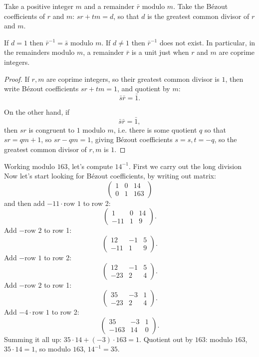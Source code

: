 \begin{theorem}
Take a positive integer \(m\) and a remainder \(\bar{r}\) modulo \(m\).
Take the B\'ezout coefficients of \(r\) and \(m\): \(sr+tm=d\), so that \(d\) is the greatest common divisor of \(r\) and \(m\).

If \(d=1\) then \(\bar{r}^{-1}=\bar{s}\) modulo \(m\).
If \(d \ne 1\) then \(\bar{r}^{-1}\) does not exist.
In particular, in the remainders modulo \(m\), a remainder \(\bar{r}\) is a unit just when \(r\) and \(m\) are coprime integers.
\end{theorem}
\begin{proof}
If \(r,m\) are coprime integers, so their greatest common divisor is \(1\), then write B\'ezout coefficients \(sr+tm=1\), and quotient by \(m\):
\[
\bar{s}\bar{r}=\bar{1}.
\]

On the other hand, if 
\[
\bar{s}\bar{r}=\bar{1},
\]
then \(sr\) is congruent to \(1\) modulo \(m\), i.e. there is some quotient \(q\) so that \(sr=qm+1\), so \(sr-qm=1\), giving B\'ezout coefficients \(s=s,t=-q\), so the greatest common divisor of \(r,m\) is \(1\).
\end{proof}
\begin{example}
Working modulo \(163\), let's compute \(14^{-1}\).
First we carry out the long division
Now let's start looking for B\'ezout coefficients, by writing out matrix:
\[
\begin{pmatrix}
1 & 0 & 14 \\
0 & 1 & 163
\end{pmatrix}
\]
and then add \(-11\cdot\text{row 1}\) to row 2:
\[
\begin{pmatrix}
1 & 0 & 14 \\
-11 & 1 & 9
\end{pmatrix}.
\]
Add \(-\text{row 2}\) to row 1:
\[
\begin{pmatrix}
12 & -1 & 5 \\
-11 & 1 & 9
\end{pmatrix}.
\]
Add \(-\text{row 1}\) to row 2:
\[
\begin{pmatrix}
12 & -1 & 5 \\
-23 & 2 & 4
\end{pmatrix}.
\]
Add \(-\text{row 2}\) to row 1:
\[
\begin{pmatrix}
35 & -3 & 1 \\
-23 & 2 & 4
\end{pmatrix}.
\]
Add \(-4 \cdot \text{row 1}\) to row 2:
\[
\begin{pmatrix}
35 & -3 & 1 \\
-163 & 14 & 0
\end{pmatrix}.
\]
Summing it all up: \(35 \cdot 14 + (-3) \cdot 163 = 1\).
Quotient out by \(163\): modulo \(163\), \(35 \cdot 14 = 1\), so modulo \(163\), \(14^{-1}=35\).
\end{example}
